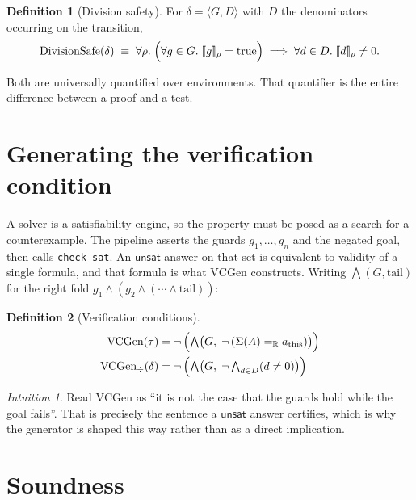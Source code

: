 \documentclass[11pt,a4paper]{article}
\newcommand{\seme}[2]{\llbracket #1 \rrbracket_{#2}}
\newcommand{\Real}{\mathbb{R}}
\newcommand{\VC}{\mathrm{VCGen}}
\newcommand{\VCd}{\mathrm{VCGen}_{\div}}
\newcommand{\DivSafe}{\mathrm{DivisionSafe}}
\newcommand{\unsat}{\mathsf{unsat}}
\newcommand{\code}[1]{\texttt{#1}}
\theoremstyle{definition}
\newtheorem{definition}{Definition}[section]
\theoremstyle{plain}
\theoremstyle{remark}
\newtheorem*{intuition}{Intuition}
\begin{document}
\begin{definition}[Division safety]
For $\delta = \langle G, D \rangle$ with $D$ the denominators occurring on the
transition,
\[
  \DivSafe(\delta) \;\equiv\;
  \forall \rho.\;
  \Bigl( \forall g \in G.\; \seme{g}{\rho} = \text{true} \Bigr)
  \;\Longrightarrow\;
  \forall d \in D.\; \seme{d}{\rho} \neq 0.
\]
\end{definition}

Both are universally quantified over environments. That quantifier is the
entire difference between a proof and a test.

\section{Generating the verification condition}

A solver is a satisfiability engine, so the property must be posed as a search
for a counterexample. The pipeline asserts the guards $g_1,\dots,g_n$ and the
negated goal, then calls \code{check-sat}. An $\unsat$ answer on that set is
equivalent to validity of a single formula, and that formula is what $\VC$
constructs. Writing $\bigwedge(G,\text{tail})$ for the right fold
$g_1 \wedge (g_2 \wedge (\cdots \wedge \text{tail}))$:

\begin{definition}[Verification conditions]
\begin{align*}
  \VC(\tau)   &= \neg\, \Bigl( \textstyle\bigwedge \bigl(G,\; \neg\,(\Sigma(A) =_{\Real} a_{\text{this}})\bigr) \Bigr) \\
  \VCd(\delta) &= \neg\, \Bigl( \textstyle\bigwedge \bigl(G,\; \neg \textstyle\bigwedge_{d \in D} (d \neq 0)\bigr) \Bigr)
\end{align*}
\end{definition}

\begin{intuition}
Read $\VC$ as ``it is not the case that the guards hold while the goal fails''.
That is precisely the sentence a $\unsat$ answer certifies, which is why the
generator is shaped this way rather than as a direct implication.
\end{intuition}

\section{Soundness}
\end{document}
